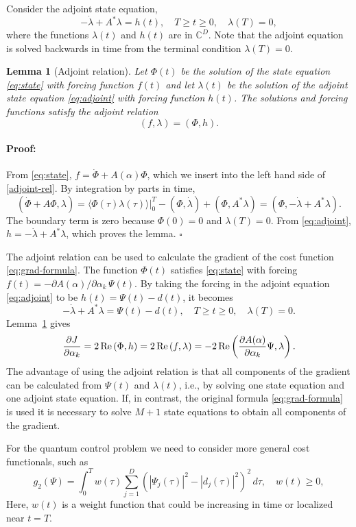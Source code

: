 \documentclass{article}
\newtheorem{lemma}{Lemma}
\begin{document}
Consider the adjoint state equation,
\begin{equation}\label{eq:adjoint}
  -\dot{\lambda} + A^* \lambda = h(t),\quad T\geq t \geq 0,\quad \lambda(T)=0,
\end{equation}
where the functions $\lambda(t)$ and $h(t)$ are in ${\mathbb
  C}^D$. Note that the adjoint equation is solved backwards in time
from the terminal condition $\lambda(T)=0$.
%
\begin{lemma}[Adjoint relation]\label{lem:ad}
  Let $\Phi(t)$ be the solution of the state equation \eqref{eq:state} with forcing function $f(t)$
  and let $\lambda(t)$ be the solution of the adjoint state equation \eqref{eq:adjoint} with forcing
  function $h(t)$. The solutions and forcing functions satisfy the adjoint relation
  \begin{equation}\label{adjoint-rel}
    (f, \lambda) = (\Phi, h).
  \end{equation}
\end{lemma}
%
\paragraph{Proof:}
From \eqref{eq:state}, $f=\dot{\Phi} + A(\alpha) \Phi$, which we insert into the left hand side of
\eqref{adjoint-rel}. By integration by parts in time,
\[
( \dot{\Phi} + A \Phi, \lambda ) = \left.\langle \Phi(\tau)\lambda(\tau)
\rangle\right|_{0}^T - ( \Phi , \dot{\lambda} ) +  ( \Phi, A^* \lambda ) = (\Phi, - \dot{\lambda} +
A^* \lambda).
\]
The boundary term is zero because $\Phi(0)=0$ and $\lambda(T)=0$. From \eqref{eq:adjoint}, $h =
-\dot{\lambda} + A^* \lambda$, which proves the lemma. $\square$

The adjoint relation can be used to calculate the gradient of the cost function
\eqref{eq:grad-formula}. The function $\Phi(t)$ satisfies \eqref{eq:state} with forcing $f(t) = -
\partial A(\alpha)/\partial \alpha_k\,\Psi(t)$. By taking the forcing in the adjoint equation
\eqref{eq:adjoint} to be $h(t) = \Psi(t)- d(t)$, it becomes
\begin{equation}\label{our-adjoint}
-\dot{\lambda} + A^* \lambda = \Psi(t)- d(t),\quad T\geq t \geq 0,\quad \lambda(T)=0.
\end{equation}
Lemma~\ref{lem:ad} gives
\[
\frac{\partial J}{\partial \alpha_k} = 2\, {\rm Re} \left( \Phi, h \right) = 2\, {\rm Re} \left( f,
\lambda \right) = -2\, {\rm Re} \left( \frac{\partial A(\alpha)}{\partial \alpha_k} \Psi, \lambda \right).
\]
The advantage of using the adjoint relation is that all components of the gradient can be calculated
from $\Psi(t)$ and $\lambda(t)$, i.e., by solving one state equation and one adjoint state
equation. If, in contrast, the original formula \eqref{eq:grad-formula} is used it is necessary to
solve $M+1$ state equations to obtain all components of the gradient.

For the quantum control problem we need to consider more general cost functionals, such as
\[
g_2(\Psi) = \int_0^T w(\tau) \sum_{j=1}^D \left( |\Psi_j(\tau)|^2 - |d_j(\tau)|^2 \right)^2\,
d\tau,\quad w(t) \geq 0,
\]
Here, $w(t)$ is a weight function that could be increasing in time or localized near $t=T$.
\end{document}

